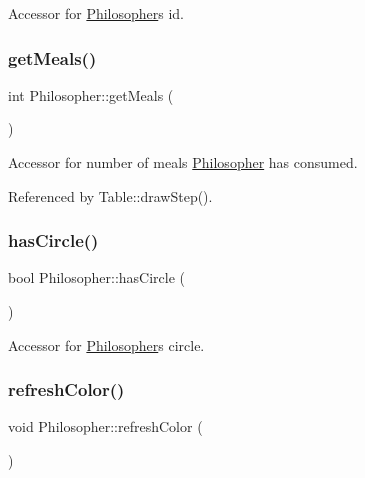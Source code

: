 Accessor for \hyperlink{class_philosopher}{Philosopher}\textquotesingle{}s id. \mbox{\label{class_philosopher_aec2c6ca7096a9ae51f35e0f68b167345}} 
\subsubsection{\texorpdfstring{get\+Meals()}{getMeals()}}
{\footnotesize\ttfamily int Philosopher\+::get\+Meals (\begin{DoxyParamCaption}{ }\end{DoxyParamCaption})\hspace{0.3cm}{\ttfamily [inline]}}

Accessor for number of meals \hyperlink{class_philosopher}{Philosopher} has consumed. 

Referenced by Table\+::draw\+Step().

\mbox{\label{class_philosopher_a3718addd7037cd1266435e7c91e84388}} 
\subsubsection{\texorpdfstring{has\+Circle()}{hasCircle()}}
{\footnotesize\ttfamily bool Philosopher\+::has\+Circle (\begin{DoxyParamCaption}{ }\end{DoxyParamCaption})\hspace{0.3cm}{\ttfamily [inline]}}

Accessor for \hyperlink{class_philosopher}{Philosopher}\textquotesingle{}s circle. \mbox{\label{class_philosopher_ae0d341934c25f1303ea0c16228e9eeae}} 
\subsubsection{\texorpdfstring{refresh\+Color()}{refreshColor()}}
{\footnotesize\ttfamily void Philosopher\+::refresh\+Color (\begin{DoxyParamCaption}{ }\end{DoxyParamCaption})}

